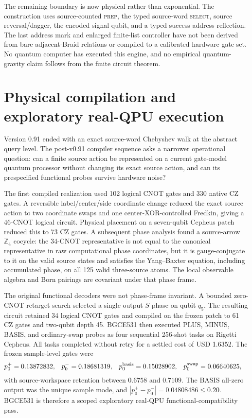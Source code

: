 \documentclass[11pt]{article}
\theoremstyle{definition}
\theoremstyle{remark}
\begin{document}
The remaining boundary is now physical rather than exponential. The construction uses source-counted \textsc{prep}, the typed source-word \textsc{select}, source reversal/dagger, the encoded signal qubit, and a typed success-address reflection. The last address mark and enlarged finite-list controller have not been derived from bare adjacent-Braid relations or compiled to a calibrated hardware gate set. No quantum computer has executed this engine, and no empirical quantum-gravity claim follows from the finite circuit theorem.

\section{Physical compilation and exploratory real-QPU execution}\label{sec:qpu092}

Version 0.91 ended with an exact source-word Chebyshev walk at the abstract query level. The post-v0.91 compiler sequence asks a narrower operational question: can a finite source action be represented on a current gate-model quantum processor without changing its exact source action, and can its prespecified functional probes survive hardware noise?

The first compiled realization used 102 logical CNOT gates and 330 native CZ gates. A reversible label/center/side coordinate change reduced the exact source action to two coordinate swaps and one center-XOR-controlled Fredkin, giving a 46-CNOT logical circuit. Physical placement on a seven-qubit Cepheus patch reduced this to 73 CZ gates. A subsequent phase analysis found a source-arrow $\mathbb Z_4$ cocycle: the 34-CNOT representative is not equal to the canonical representative in raw computational phase coordinates, but it is gauge-conjugate to it on the valid source states and satisfies the Yang--Baxter equation, including accumulated phase, on all 125 valid three-source atoms. The local observable algebra and Born pairings are covariant under that phase frame.

The original functional decoders were not phase-frame invariant. A bounded zero-CNOT retarget search selected a single output $S$ phase on qubit $q_5$. The resulting circuit retained 34 logical CNOT gates and compiled on the frozen patch to 61 CZ gates and two-qubit depth 45. BGCE531 then executed PLUS, MINUS, BASIS, and ordinary-swap probes as four sequential 256-shot tasks on Rigetti Cepheus. All tasks completed without retry for a settled cost of USD 1.6352. The frozen sample-level gates were
\begin{align}
 p_{0}^{+}&=0.13872832,&
 p_{0}^{-}&=0.18681319,&
 p_{0}^{\rm basis}&=0.15028902,&
 p_{0}^{\rm swap}&=0.06640625,
\end{align}
with source-workspace retention between $0.6758$ and $0.7109$. The BASIS all-zero output was the unique sample mode, and $|p_0^+-p_0^-|=0.04808486\le0.20$. BGCE531 is therefore a scoped exploratory real-QPU functional-compatibility pass.
\end{document}
